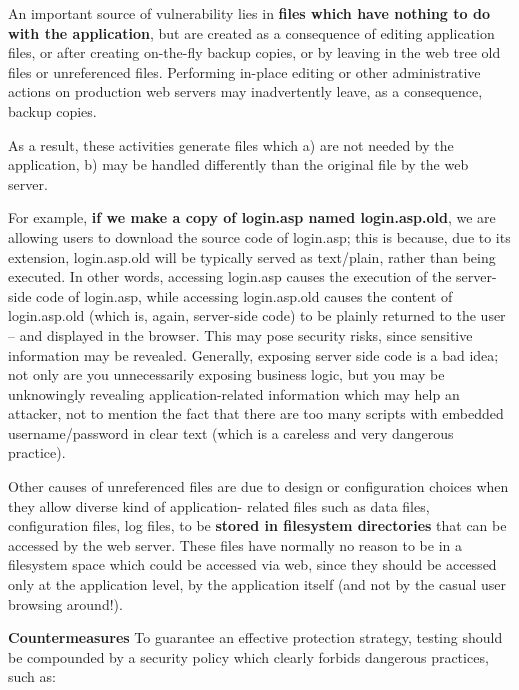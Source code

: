 	An important source of vulnerability lies in {\bf files which have nothing to do with the 
	application}, but are created as a consequence of editing application files, or after 
	creating on-the-fly backup copies, or by leaving in the web tree old files or unreferenced 
	files. Performing in-place editing or other administrative actions on production web servers 
	may inadvertently leave, as a consequence, backup copies.

	As a result, these activities generate files which 
	a) are not needed by the application, 
	b) may be handled differently than the original file by the web server. 

	For example, {\bf if we make a copy of login.asp named login.asp.old}, we are allowing users to
	download the source code of login.asp; this is because, due to its extension, login.asp.old 
	will be typically served as text/plain, rather than being executed. In other words, accessing 
	login.asp causes the execution of the server-side code of login.asp, while accessing 
	login.asp.old causes the content of login.asp.old (which is, again, server-side code) to be 
	plainly returned to the user – and displayed in the browser. This may pose security risks, 
	since sensitive information may be revealed. Generally, exposing server side code is a bad 
	idea; not only are you unnecessarily exposing business logic, but you
	may be unknowingly revealing application-related information which may help an attacker, 
	not to mention the fact that there are too many scripts with embedded username/password 
	in clear text (which is a careless and very dangerous practice).

	Other causes of unreferenced files are due to design or configuration choices when they 
	allow diverse kind of application- related files such as data files, configuration files, 
	log files, to be {\bf stored in filesystem directories} that can be accessed by the
	web server. These files have normally no reason to be in a filesystem space which could 
	be accessed via web, since they should be accessed only at the application level, by the 
	application itself (and not by the casual user browsing around!).

	{\bf Countermeasures}
	To guarantee an effective protection strategy, testing should be compounded by a security 
	policy which clearly forbids dangerous practices, such as:

